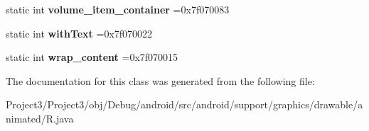 \begin{DoxyCompactItemize}
static int {\bfseries volume\+\_\+item\+\_\+container} =0x7f070083
\item 
\mbox{\label{classandroid_1_1support_1_1graphics_1_1drawable_1_1animated_1_1R_1_1id_a1ef3de44713cf9bb01c8466508cdcd2b}} 
static int {\bfseries with\+Text} =0x7f070022
\item 
\mbox{\label{classandroid_1_1support_1_1graphics_1_1drawable_1_1animated_1_1R_1_1id_a8c2eafd0e31524fe1eb9b09ae175b114}} 
static int {\bfseries wrap\+\_\+content} =0x7f070015
\end{DoxyCompactItemize}


The documentation for this class was generated from the following file\+:\begin{DoxyCompactItemize}
\item 
Project3/\+Project3/obj/\+Debug/android/src/android/support/graphics/drawable/animated/R.\+java\end{DoxyCompactItemize}
